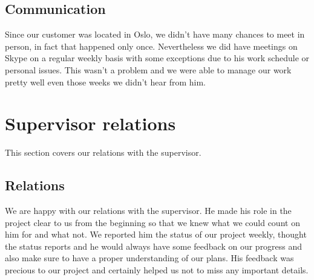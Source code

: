 
\subsection{Communication}
Since our customer was located in Oslo, we didn't have many chances to meet in person,
in fact that happened only once. Nevertheless we did have meetings on Skype on a regular weekly basis
with some exceptions due to his work schedule or personal issues.
This wasn't a problem and we were able to manage our work pretty well even those
weeks we didn't hear from him.


\section{Supervisor relations}
This section covers our relations with the supervisor.

\subsection{Relations}
We are happy with our relations with the supervisor.
He made his role in the project clear to us from the beginning so that we knew
what we could count on him for and what not.
We reported him the status of our project weekly, thought the status reports and
he would always have some feedback on our progress and also make sure to have a proper
understanding of our plans. His feedback was precious to our project
and certainly helped us not to miss any important details.


